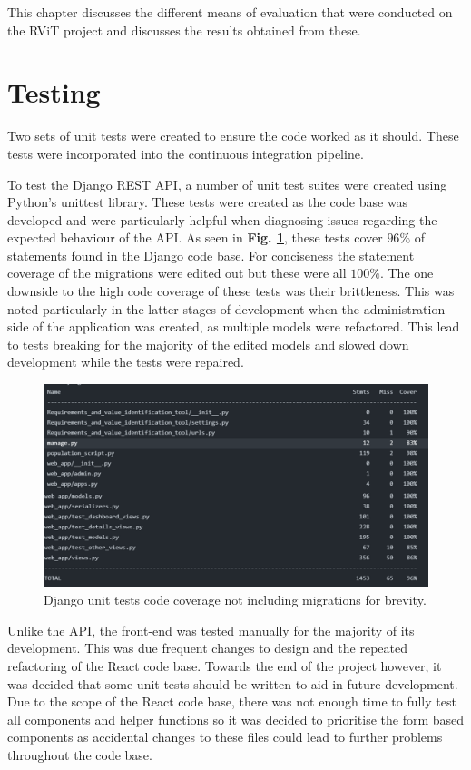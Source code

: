 \documentclass[l4proj.tex]{subfiles}
\begin{document}
This chapter discusses the different means of evaluation that were conducted on the RViT project and discusses the results obtained from these.

\section{Testing}
Two sets of unit tests were created to ensure the code worked as it should. These tests were incorporated into the continuous integration pipeline.

To test the Django REST API, a number of unit test suites were created using Python's unittest library. These tests were created as the code base was developed and were particularly helpful when diagnosing issues regarding the expected behaviour of the API. As seen in \textbf{Fig. \ref{fig:django unit tests}}, these tests cover $96\%$ of statements found in the Django code base. For conciseness the statement coverage of the migrations were edited out but these were all $100\%$. The one downside to the high code coverage of these tests was their brittleness. This was noted particularly in the latter stages of development when the administration side of the application was created, as multiple models were refactored. This lead to tests breaking for the majority of the edited models and slowed down development while the tests were repaired.
 

\begin{figure}[h!]
\begin{center}
\includegraphics[scale=0.5]{dissertation/images/DjangoUnitTests.png}
\caption{Django unit tests code coverage not including migrations for brevity.}
\label{fig:django unit tests} 
\end{center}
\end{figure}

Unlike the API, the front-end was tested manually for the majority of its development. This was due frequent changes to design and the repeated refactoring of the React code base. Towards the end of the project however, it was decided that some unit tests should be written to aid in future development. Due to the scope of the React code base, there was not enough time to fully test all components and helper functions so it was decided to prioritise the form based components as accidental changes to these files could lead to further problems throughout the code base.
\end{document}
